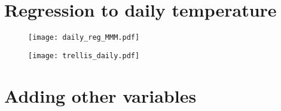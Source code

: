 \documentclass[letterpaper,10pt]{article}
\begin{document}
\section{Regression to daily temperature}                   %
\clearpage                                                  %
\begin{figure}                                              %
\centerline{\texttt{[image: daily\_reg\_MMM.pdf]}} %
\end{figure}                                                %

\clearpage
\begin{figure}
  \texttt{[image: trellis\_daily.pdf]}
\end{figure}

\section{Adding other variables}                            %
\clearpage                                                  %



\clearpage
\end{document}
